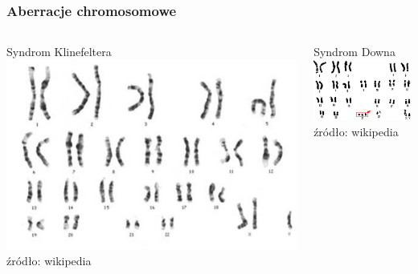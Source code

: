 \documentclass[table]{beamer}
\begin{document}
\begin{frame}\frametitle{Aberracje chromosomowe}
 \begin{columns}    
 Syndrom Klinefeltera
 \includegraphics[width=0.9 \textwidth]{SER-images/Klinefelter_syndrome_kariotyp.jpg}\\
	   \tiny{źródło: wikipedia}  

 Syndrom Downa
    \includegraphics[width=0.9 \textwidth]{SER-images/Down_syndrome_karyotype.png}\\
	   \tiny{źródło: wikipedia}  	    
\end{columns}
\end{frame}
\end{document}

